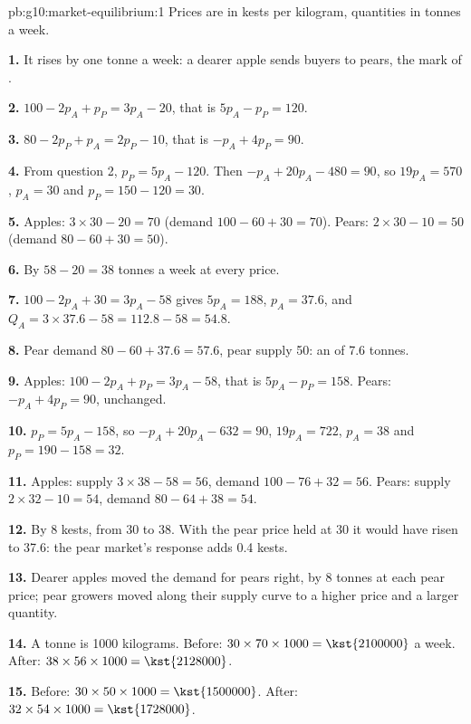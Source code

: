 \begin{solution}{pb:g10:market-equilibrium:1}
Prices are in kests per kilogram, quantities in tonnes a week.

\textbf{1.} It rises by one tonne a week: a dearer apple sends buyers to pears, the mark of .

\textbf{2.} $100 - 2p_A + p_P = 3p_A - 20$, that is $5p_A - p_P = 120$.

\textbf{3.} $80 - 2p_P + p_A = 2p_P - 10$, that is $-p_A + 4p_P = 90$.

\textbf{4.} From question 2, $p_P = 5p_A - 120$. Then $-p_A + 20p_A - 480 = 90$, so $19p_A = 570$, $p_A = 30$ and $p_P = 150 - 120 = 30$.

\textbf{5.} Apples: $3 \times 30 - 20 = 70$ (demand $100 - 60 + 30 = 70$). Pears: $2 \times 30 - 10 = 50$ (demand $80 - 60 + 30 = 50$).

\textbf{6.} By $58 - 20 = 38$ tonnes a week at every price.

\textbf{7.} $100 - 2p_A + 30 = 3p_A - 58$ gives $5p_A = 188$, $p_A = 37.6$, and $Q_A = 3 \times 37.6 - 58 = 112.8 - 58 = 54.8$.

\textbf{8.} Pear demand $80 - 60 + 37.6 = 57.6$, pear supply 50: an  of 7.6 tonnes.

\textbf{9.} Apples: $100 - 2p_A + p_P = 3p_A - 58$, that is $5p_A - p_P = 158$. Pears: $-p_A + 4p_P = 90$, unchanged.

\textbf{10.} $p_P = 5p_A - 158$, so $-p_A + 20p_A - 632 = 90$, $19p_A = 722$, $p_A = 38$ and $p_P = 190 - 158 = 32$.

\textbf{11.} Apples: supply $3 \times 38 - 58 = 56$, demand $100 - 76 + 32 = 56$. Pears: supply $2 \times 32 - 10 = 54$, demand $80 - 64 + 38 = 54$.

\textbf{12.} By 8 kests, from 30 to 38. With the pear price held at 30 it would have risen to 37.6: the pear market's response adds 0.4 kests.

\textbf{13.} Dearer apples moved the demand for pears right, by 8 tonnes at each pear price; pear growers moved along their supply curve to a higher price
and a larger quantity.

\textbf{14.} A tonne is \num{1000} kilograms. Before: $30 \times 70 \times 1000 = \kst{2100000}$ a week. After: $38 \times 56 \times 1000 = \kst{2128000}$.

\textbf{15.} Before: $30 \times 50 \times 1000 = \kst{1500000}$. After: $32 \times 54 \times 1000 = \kst{1728000}$.


\end{solution}
